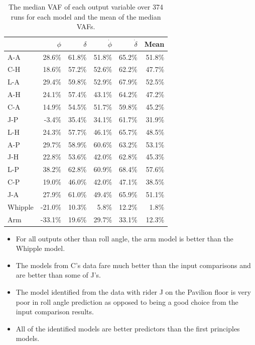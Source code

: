 \documentclass[a4paper]{article}
\begin{document}
\begin{table}
  \label{tab:MedianVAFOutputs}
  \caption{The median VAF of each output variable over 374 runs for each model
  and the mean of the median VAFs.}
  \centering
  \begin{tabular}{lrrrrr}
            & $\phi$   & $\delta$ & $\dot{\phi}$ & $\dot{\delta}$ & Mean   \\
    \hline
    A-A     & 28.6\%   & 61.8\%   & 51.8\%      & 65.2\%          & 51.8\% \\
    C-H     & 18.6\%   & 57.2\%   & 52.6\%      & 62.2\%          & 47.7\% \\
    L-A     & 29.4\%   & 59.8\%   & 52.9\%      & 67.9\%          & 52.5\% \\
    A-H     & 24.1\%   & 57.4\%   & 43.1\%      & 64.2\%          & 47.2\% \\
    C-A     & 14.9\%   & 54.5\%   & 51.7\%      & 59.8\%          & 45.2\% \\
    J-P     & -3.4\%   & 35.4\%   & 34.1\%      & 61.7\%          & 31.9\% \\
    L-H     & 24.3\%   & 57.7\%   & 46.1\%      & 65.7\%          & 48.5\% \\
    A-P     & 29.7\%   & 58.9\%   & 60.6\%      & 63.2\%          & 53.1\% \\
    J-H     & 22.8\%   & 53.6\%   & 42.0\%      & 62.8\%          & 45.3\% \\
    L-P     & 38.2\%   & 62.8\%   & 60.9\%      & 68.4\%          & 57.6\% \\
    C-P     & 19.0\%   & 46.0\%   & 42.0\%      & 47.1\%          & 38.5\% \\
    J-A     & 27.9\%   & 61.0\%   & 49.4\%      & 65.9\%          & 51.1\% \\
    Whipple & -21.0\%  & 10.3\%   & 5.8\%       & 12.2\%          &  1.8\% \\
    Arm     & -33.1\%  & 19.6\%   & 29.7\%      & 33.1\%          & 12.3\% \\
  \end{tabular}
\end{table}

\begin{itemize}
  \item
    For all outputs other than roll angle, the arm model is better than
    the Whipple model.
  \item
    The models from C's data fare much better than the input comparisons and
    are better than some of J's.
  \item
    The model identified from the data with rider J on the Pavilion floor is
    very poor in roll angle prediction as opposed to being a good choice from
    the input comparison results.
  \item
    All of the identified models are better predictors than the first
    principles models.
\end{itemize}
\end{document}
